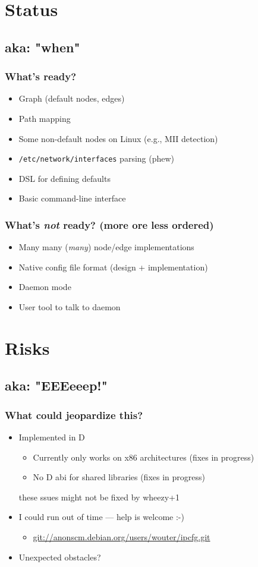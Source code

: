 \documentclass[ignorenonframetext]{beamer}
\begin{document}
\section{Status}
\subsection{aka: "when"}
\begin{frame}
  \frametitle{What's ready?}
  \begin{itemize}
    \item Graph (default nodes, edges)
    \item Path mapping
    \item Some non-default nodes on Linux (e.g., MII detection)
    \item \texttt{/etc/network/interfaces} parsing (phew)
    \item DSL for defining defaults
    \item Basic command-line interface
  \end{itemize}
\end{frame}

\begin{frame}
  \frametitle{What's \emph{not} ready? (more ore less ordered)}
  \begin{itemize}
    \item Many many (\emph{many}) node/edge implementations
    \item Native config file format (design + implementation)
    \item Daemon mode
    \item User tool to talk to daemon
  \end{itemize}
\end{frame}

\section{Risks}
\subsection{aka: "EEEeeep!"}
\begin{frame}
  \frametitle{What could jeopardize this?}
  \begin{itemize}
    \item Implemented in D
    \begin{itemize}
      \item Currently only works on x86 architectures (fixes in progress)
      \item No D abi for shared libraries (fixes in progress)
    \end{itemize}

    these ssues might not be fixed by wheezy+1

    \item I could run out of time --- help is welcome :-)
    \begin{itemize}
      \item \url{git://anonscm.debian.org/users/wouter/ipcfg.git}
    \end{itemize}
    \item Unexpected obstacles?
  \end{itemize}
\end{frame}
\end{document}
